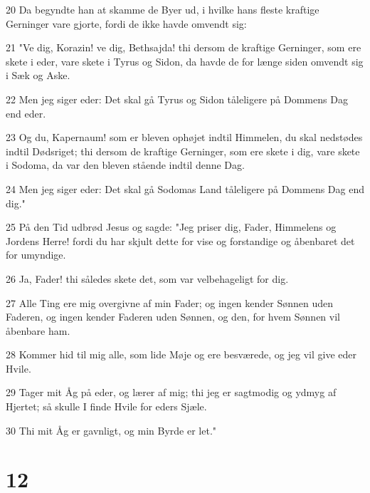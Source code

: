\par 20 Da begyndte han at skamme de Byer ud, i hvilke hans fleste kraftige Gerninger vare gjorte, fordi de ikke havde omvendt sig:
\par 21 "Ve dig, Korazin! ve dig, Bethsajda! thi dersom de kraftige Gerninger, som ere skete i eder, vare skete i Tyrus og Sidon, da havde de for længe siden omvendt sig i Sæk og Aske.
\par 22 Men jeg siger eder: Det skal gå Tyrus og Sidon tåleligere på Dommens Dag end eder.
\par 23 Og du, Kapernaum! som er bleven ophøjet indtil Himmelen, du skal nedstødes indtil Dødsriget; thi dersom de kraftige Gerninger, som ere skete i dig, vare skete i Sodoma, da var den bleven stående indtil denne Dag.
\par 24 Men jeg siger eder: Det skal gå Sodomas Land tåleligere på Dommens Dag end dig."
\par 25 På den Tid udbrød Jesus og sagde: "Jeg priser dig, Fader, Himmelens og Jordens Herre! fordi du har skjult dette for vise og forstandige og åbenbaret det for umyndige.
\par 26 Ja, Fader! thi således skete det, som var velbehageligt for dig.
\par 27 Alle Ting ere mig overgivne af min Fader; og ingen kender Sønnen uden Faderen, og ingen kender Faderen uden Sønnen, og den, for hvem Sønnen vil åbenbare ham.
\par 28 Kommer hid til mig alle, som lide Møje og ere besværede, og jeg vil give eder Hvile.
\par 29 Tager mit Åg på eder, og lærer af mig; thi jeg er sagtmodig og ydmyg af Hjertet; så skulle I finde Hvile for eders Sjæle.
\par 30 Thi mit Åg er gavnligt, og min Byrde er let."

\chapter{12}

